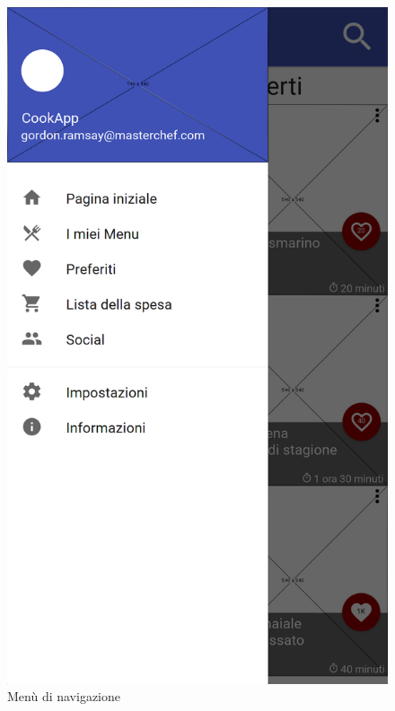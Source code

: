 \begin{figure}[H]
	\begin{minipage}{.49\textwidth}
		\includegraphics[width=\textwidth]{img/wireframe/menu.png}
		\caption{Menù di navigazione}
	\end{minipage}
	\hfill
	\begin{minipage}{.49\textwidth}

\end{minipage}
\end{figure}
